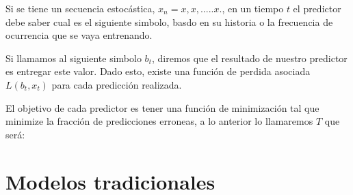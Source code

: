Si se tiene un secuencia estocástica, $x_{n} = x , x ,.....x .  $, en un tiempo $t$ el predictor debe saber cual es el siguiente simbolo, basdo en su historia o la frecuencia de ocurrencia que se vaya entrenando.

Si llamamos al siguiente simbolo $b_{t}$, diremos que el resultado de nuestro predictor es entregar este valor. Dado esto, existe una función de perdida asociada $L( b_{t},x_{t} )$ para cada predicción realizada. 

El objetivo de cada predictor es tener una función de minimización tal que minimize la fracción de predicciones erroneas, a lo anterior lo llamaremos $T$ que será:










\section{Modelos tradicionales}
 
